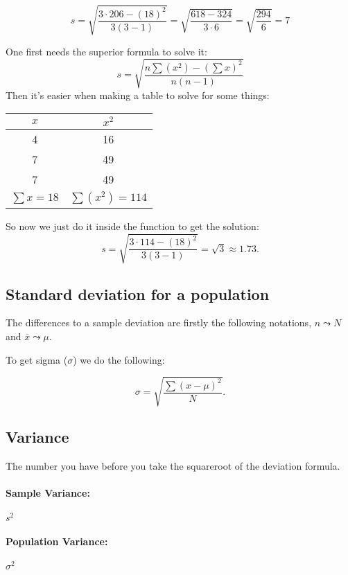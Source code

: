 \documentclass{book}
\begin{document}
\[ s = \sqrt{\frac{3\cdot 206 - (18)^2}{3(3-1)}} 
= \sqrt{\frac{618-324}{3\cdot 6}} = \sqrt{\frac{294}{6}} = 7\] 


One first needs the superior formula to solve it:
\[s= \sqrt{\frac{n\sum (x^2) - (\sum x)^2 }{n(n-1)}}\] 
Then it's easier when making a table to solve for some things:


\begin{table}[htbp]
    \centering
    \begin{tabular}{c|c}
        \toprule
        $x$ & $x^2$ \\
        \midrule
        4 & 16 \\
        7 & 49 \\
        7 & 49 \\
        \midrule
        $\sum x=18$ & $\sum(x^2)=114$ \\
        \bottomrule
    \end{tabular}
\end{table}

So now we just do it inside the function to get the solution:
\[
    s= \sqrt{\frac{3\cdot 114 - (18)^2}{3(3-1)}} = \sqrt{3} \approx 1.73
.\] 


\subsection{Standard deviation for a population}

The differences to a sample deviation are firstly the following notations, 
$n \leadsto N$ and $\overline{x} \leadsto \mu$.

To get sigma ($\sigma$) we do the following:

\[ \sigma = \sqrt{\frac{\sum (x-\mu)^2}{N}} .\] 


\subsection{Variance}
The number you have before you take the squareroot of the deviation formula.

\paragraph{Sample Variance:} $s^2$
\paragraph{Population Variance:} $\sigma^2$
\end{document}
